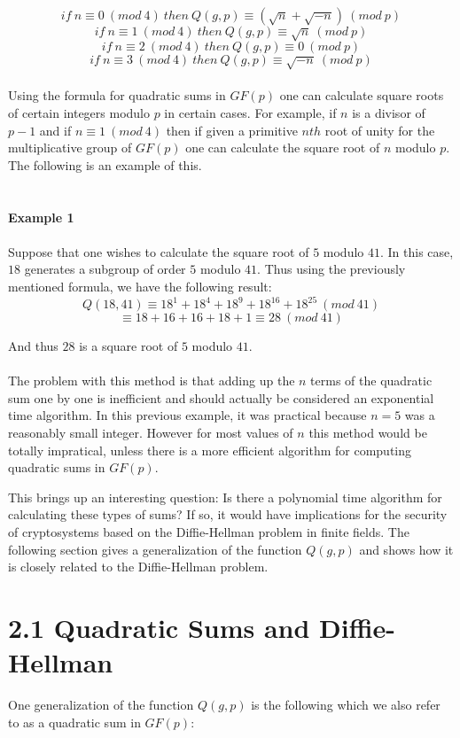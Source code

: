\documentclass[final,letterpaper,oneside,10pt]{article}
\begin{document}
\[if~ n\equiv0~(mod~4)~then~Q(g,p) \equiv (\sqrt{n}+\sqrt{-n})~(mod~p)\]
\[if~ n\equiv1~(mod~4)~then~Q(g,p) \equiv \sqrt{n}~(mod~ p)\]
\[if~ n\equiv2~(mod~4)~then~Q(g,p) \equiv 0~(mod~ p)\]
\[if~ n\equiv3~(mod~4)~then~Q(g,p) \equiv \sqrt{-n}~(mod~ p)\]
\\

Using the formula for quadratic sums in $GF(p)$ one can calculate square roots of certain integers modulo $p$ in certain cases.
For example, if $n$ is a divisor of $p-1$ and if $n\equiv 1~(mod~4)$ then if given a primitive $nth$ root of unity for the multiplicative 
group of $GF(p)$ one can calculate the square root of $n$ modulo $p$.  The following is an example of this.
\\
\\
\\
\textbf{Example 1}
\\
\\
Suppose that one wishes to calculate the square root of $5$ modulo $41$.  In this case, $18$ generates a subgroup of order $5$
modulo $41$.  Thus using the previously mentioned formula, we have the following result:
\\
\[Q(18,41)\equiv 18^1+18^4+18^9+18^{16}+18^{25}~(mod~41)\]
\[\equiv 18+16+16+18+1\equiv 28~(mod~41)\]

And thus $28$ is a square root of $5$ modulo $41$.
\\
\\
The problem with this method is that adding up the $n$ terms of the quadratic sum one by one is inefficient and should actually be
considered an exponential time algorithm.  In this previous example, it was practical because $n=5$ was a reasonably small integer.
However for most values of $n$ this method would be totally impratical, unless there is a more efficient algorithm for computing
quadratic sums in $GF(p)$.

This brings up an interesting question: Is there a polynomial time algorithm for calculating these types of sums?  If so, it would have
implications for the security of cryptosystems based on the Diffie-Hellman problem in finite fields.  The following section gives a generalization
of the function $Q(g,p)$ and shows how it is closely related to the Diffie-Hellman problem.

\section*{2.1 Quadratic Sums and Diffie-Hellman}
One generalization of the function $Q(g,p)$ is the following which we also refer to as a quadratic sum in $GF(p)$:
\end{document}
